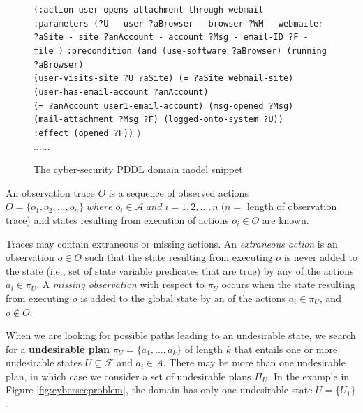 \begin{figure}[pbt]
{{{\hspace*{35pt}\texttt{(:action user-opens-attachment-through-webmail}\\
\hspace*{35pt}\texttt{:parameters (?U - user ?aBrowser - browser ?WM - webmailer \\\hspace*{35pt}?aSite - site  ?anAccount - account ?Msg - email-ID  ?F - file )}
\hspace*{35pt}\texttt{:precondition (and  (use-software ?aBrowser) (running ?aBrowser) \\\hspace*{35pt}(user-visits-site ?U ?aSite) (= ?aSite webmail-site)\\\hspace*{35pt}(user-has-email-account ?anAccount)\\\hspace*{35pt}(= ?anAccount user1-email-account) (msg-opened ?Msg)\\\hspace*{35pt}(mail-attachment ?Msg ?F) (logged-onto-system ?U))}\\
\hspace*{35pt}\texttt{:effect (opened ?F))} 
 )\\\hspace*{35pt}$\ldots\ldots$
}
}
}
\caption{The cyber-security PDDL domain model snippet}
\label{fig:cybersecdomain}
\end{figure}

\sloppy
\begin{definition}
An observation trace $O$ is a sequence of observed actions $O = \{o_1, o_2, ... ,o_n\}  \;where\; o_i\in \mathcal{A}\; and \; i=1,2, \dots ,n\; (n = $ length of observation trace) and states resulting from execution of actions $o_i\in O$ are known. 
\end{definition}

Traces may contain extraneous or missing actions.  An \emph{extraneous action} is an observation $o \in O$ such that the state resulting from executing $o$ is never added to the state (i.e., set of state variable predicates that are true) by any of the actions $a_i \in \pi_U$. A \emph{missing observation} with respect to $\pi_U$ occurs when the state resulting from executing $o$ is added to the global state by an of the actions $a_i \in \pi_U$, and $o \notin O$.

When we are looking for possible paths leading to an undesirable state, we search for a \textbf{undesirable plan} $\pi_U = \{a_1, \dots ,a_k\}$ of length $k$ that entails one or more undesirable states $U\subseteq \mathcal{F}$ and $a_i \in A$. There may be more than one undesirable plan, in which case we consider a set of undesirable plans $\Pi_U$. In the example in Figure \ref{fig:cybersecproblem}, the domain has only one undesirable state $U=\lbrace U_1\rbrace$.


